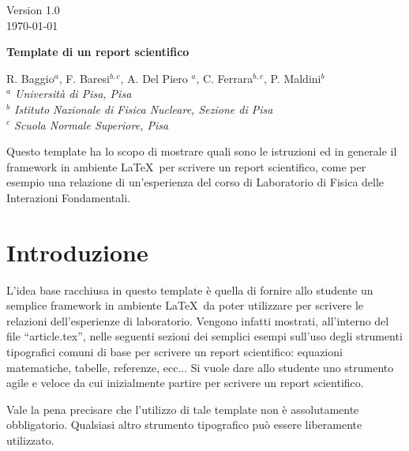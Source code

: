 \documentclass[a4paper,10pt]{article}
\newcommand{\latex}{\LaTeX}
\begin{document}
\begin{flushright}           
Version 1.0\\   
\today
\end{flushright} 

\begin{center}
\Large{\bf Template di un report scientifico}

\vspace*{1cm}                                 
\large{R. Baggio$^{a}$, F. Baresi$^{b,c}$, A. Del Piero $^{a}$, C. Ferrara$^{b,c}$, P. Maldini$^{b}$ }\\ 
\vspace*{0.5cm}       
{\small {\em $^{a}$ Universit\`a di Pisa, Pisa}} \\
{\small {\em $^{b}$ Istituto Nazionale di Fisica Nucleare, Sezione di Pisa}} \\ 
{\small {\em $^{c}$ Scuola Normale Superiore, Pisa}}\\

\vspace*{1.cm}
\end{center}

{ \abstract  Questo template ha lo scopo di mostrare quali sono le istruzioni ed in generale il framework
in ambiente \latex\ per scrivere un report scientifico, come per esempio una relazione di un'esperienza del corso di 
Laboratorio di Fisica delle Interazioni Fondamentali.
}


\section{Introduzione}
\label{sec:intro} 
L'idea base racchiusa in questo template \`e quella di fornire allo studente un semplice 
framework in ambiente \latex\ da poter utilizzare per scrivere le relazioni dell'esperienze di laboratorio.
Vengono infatti mostrati, all'interno del file ``article.tex'',  nelle seguenti sezioni dei semplici esempi sull'uso 
degli strumenti tipografici comuni di base per scrivere un report scientifico: equazioni matematiche, tabelle, referenze, ecc... 
Si vuole dare allo studente uno strumento agile e veloce da cui inizialmente partire per scrivere un report scientifico.

Vale la pena precisare che l'utilizzo di tale template non \`e assolutamente obbligatorio. Qualsiasi altro strumento 
tipografico pu\`o essere liberamente utilizzato.

\end{document}

